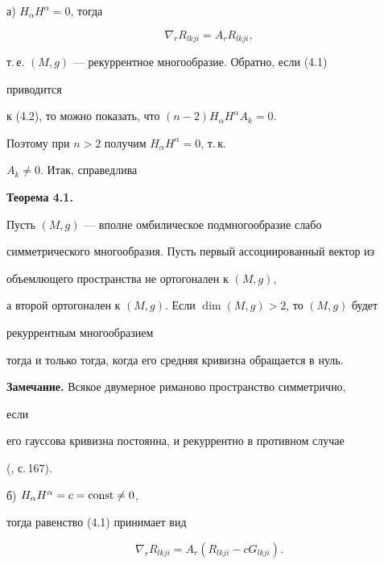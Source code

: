 \medskip





а) $H_\alpha H^\alpha=0$, тогда


\begin{equation}


\nabla_r R_{lkji}=A_r R_{lkji},\tag{4.2}


\end{equation}


т.\,е. $(M,g)$ --- рекуррентное многообразие. Обратно, если (4.1)


приводится


к (4.2), то можно показать, что $(n-2)H_\alpha H^\alpha A_k=0$.


Поэтому при $n>2$ получим $H_\alpha H^\alpha=0$, т.\,к.


$A_k\ne 0$. Итак, справедлива


\medskip





{\bf Теорема 4.1.} {\it


Пусть $(M,g)$ --- вполне омбилическое подмногообразие слабо


симметрического многообразия. Пусть первый ассоциированный вектор из


объемлющего пространства не ортогонален к $(M,g)$,


а второй ортогонален к $(M,g)$. Если $\dim(M,g)>2$, то $(M,g)$ будет


рекуррентным многообразием


тогда и только тогда, когда его средняя кривизна обращается в нуль.


}


\medskip





{\bf Замечание.} Всякое двумерное риманово пространство симметрично,


если


его гауссова кривизна постоянна, и рекуррентно в противном случае


(\cite{11}, с.\,167).


\medskip





б) $H_\alpha H^\alpha=c=\operatorname{const}\ne 0$,


тогда равенство (4.1) принимает вид


\begin{equation}


\nabla_r R_{lkji}=A_r(R_{lkji}-cG_{lkji}).\tag{4.3}


\end{equation}


